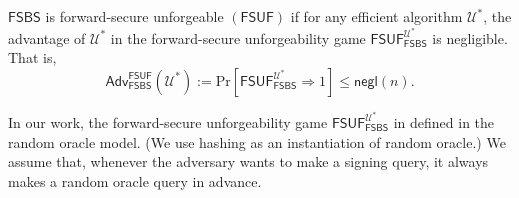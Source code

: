 \documentclass[runningheads]{llncs}
\def\Pr{\mathrm{Pr}}
\def\Adv{\mathsf{Adv}}
\begin{document}
 	\begin{definition}   \label{on} 
 	$\mathsf{FSBS}$ is forward-secure unforgeable $(\mathsf{FSUF})$ if for any efficient algorithm  $\mathcal{U}^*$, the advantage of $\mathcal{U}^*$ in the forward-secure unforgeability game $\mathsf{FSUF}_{\mathsf{FSBS}}^{\mathcal{U}^*}$ is negligible. That is,
 	$$\Adv^{\mathsf{FSUF}}_{\mathsf{FSBS}}(\mathcal{U}^*):=\Pr[\mathsf{FSUF}_{\mathsf{FSBS}}^{\mathcal{U}^*}\Rightarrow 1] \leq \mathsf{negl}(n).$$ 
 	
 \end{definition}
 
 
 In our work, the forward-secure unforgeability game $\textsf{FSUF}_{\textsf{FSBS}}^{\mathcal{U}^*}$ in defined in the random oracle model. (We use hashing as an instantiation of random oracle.)
 We assume that, whenever the adversary wants to make a signing query, it always makes a random oracle query in advance.
\end{document}
